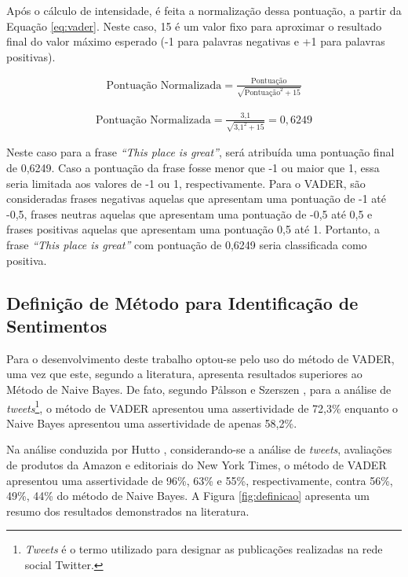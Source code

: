 Após o cálculo de intensidade, é feita a normalização dessa
pontuação, a partir da Equação \ref{eq:vader}. Neste caso, 15 é um valor
fixo para aproximar o resultado final do valor máximo esperado (-1 para
palavras negativas e +1 para palavras positivas).

\begin{equation}
\begin{gathered}
\text{Pontuação Normalizada}
=
\frac{\text{Pontuação}}{\sqrt{\text{Pontuação}^2 + 15}}
\label{eq:vader}
\end{gathered}
\end{equation}


\begin{equation}
\begin{gathered}
\text{Pontuação Normalizada}
=
\frac{\text{3,1}}{\sqrt{\text{3,1}^2 + 15}} = 0,6249
\label{eq:vaderscore}
\end{gathered}
\end{equation}

Neste caso para a frase \textit{``This place is great''}, será
atribuída uma pontuação final de 0,6249.  Caso a
pontuação da frase fosse menor que -1 ou maior que 1, essa seria limitada aos
valores de -1 ou 1, respectivamente. Para o \ac{VADER}, são consideradas frases negativas
aquelas que apresentam uma pontuação de -1 até -0,5, frases neutras aquelas que
apresentam uma pontuação de -0,5 até 0,5 e frases positivas aquelas que
apresentam uma pontuação 0,5 até 1.
Portanto, a frase \textit{``This place is great''} com pontuação de 0,6249 seria
classificada como positiva.

\subsection{Definição de Método para Identificação de Sentimentos}

Para o desenvolvimento deste trabalho optou-se pelo uso do método de \ac{VADER},
uma vez que este, segundo a literatura, apresenta resultados superiores ao
Método de Naive Bayes. De fato, segundo Pålsson e Szerszen
\cite{SentimentinSocialMedia}, para a análise de
\textit{tweets}\footnote{\textit{Tweets} é o termo utilizado para designar as publicações realizadas na rede social Twitter.}, o método de
\ac{VADER} apresentou uma assertividade de 72,3\% enquanto o Naive Bayes apresentou uma assertividade de apenas 58,2\%.

Na análise conduzida por Hutto \cite{conf/icwsm/HuttoG14},
considerando-se a análise de \textit{tweets}, avaliações de produtos da Amazon e
editoriais do New York Times, o método de \ac{VADER} apresentou uma assertividade de 96\%, 63\% e 55\%, respectivamente, contra
56\%, 49\%, 44\% do método de Naive Bayes. A Figura \ref{fig:definicao}
apresenta um resumo dos resultados demonstrados na literatura.

